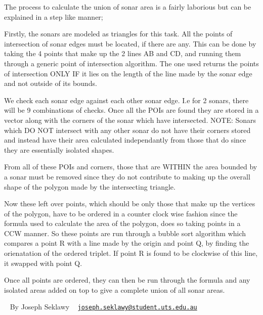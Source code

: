The process to calculate the union of sonar area is a fairly laborious but can be explained in a step like manner;
\begin{DoxyEnumerate}
\item Firstly, the sonars are modeled as triangles for this task. All the points of intersection of sonar edges must be located, if there are any. This can be done by taking the 4 points that make up the 2 lines AB and CD, and running them through a generic point of intersection algorithm. The one used returns the points of intersection O\+N\+LY IF it lies on the length of the line made by the sonar edge and not outside of its bounds.
\item We check each sonar edge against each other sonar edge. I.\+e for 2 sonars, there will be 9 combinations of checks. Once all the P\+O\+Is are found they are stored in a vector along with the corners of the sonar which have intersected. N\+O\+TE\+: Sonars which DO N\+OT intersect with any other sonar do not have their corners stored and instead have their area calculated independantly from those that do since they are essentially isolated shapes.
\item From all of these P\+O\+Is and corners, those that are W\+I\+T\+H\+IN the area bounded by a sonar must be removed since they do not contribute to making up the overall shape of the polygon made by the intersecting triangle.
\item Now these left over points, which should be only those that make up the vertices of the polygon, have to be ordered in a counter clock wise fashion since the formula used to calculate the area of the polygon, does so taking points in a C\+CW manner. So these points are run through a bubble sort algorithm which compares a point R with a line made by the origin and point Q, by finding the orienatation of the ordered triplet. If point R is found to be clockwise of this line, it swapped with point Q.
\item Once all points are ordered, they can then be run through the formula and any isolated areas added on top to give a complete union of all sonar areas.
\end{DoxyEnumerate}

~\newline
 By Joseph Seklawy ~\newline
 \href{mailto:joseph.seklawy@student.uts.edu.au}{\tt joseph.\+seklawy@student.\+uts.\+edu.\+au} 